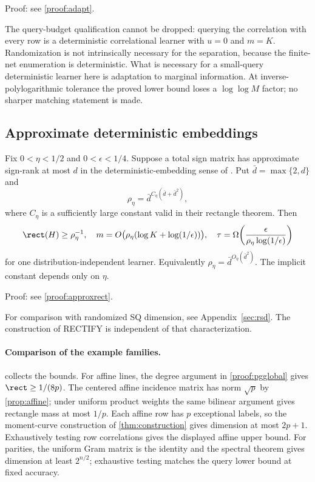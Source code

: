 \noindent Proof: see \cref{proof:adapt}.\par


The query-budget qualification cannot be dropped: querying the correlation with every row is a deterministic correlational learner with $u=0$ and $m=K$. Randomization is not intrinsically necessary for the separation, because the finite-net enumeration is deterministic. What is necessary for a small-query deterministic learner here is adaptation to marginal information. At inverse-polylogarithmic tolerance the proved lower bound loses a $\log\log M$ factor; no sharper matching statement is made.

\subsection{Approximate deterministic embeddings}
\begin{corollary}\label{cor:approxrect}
Fix $0<\eta<1/2$ and $0<\epsilon<1/4$. Suppose a total sign matrix has approximate sign-rank at most $d$ in the deterministic-embedding sense of \citet{BHKR26}. Put $\bar d=\max\{2,d\}$ and
\[
 \rho_\eta=\bar d^{C_\eta(\bar d+\bar d^2)},
\]
where $C_\eta$ is a sufficiently large constant valid in their rectangle theorem. Then
\[
 \rect(H)\ge\rho_\eta^{-1},\quad
 m=O\bigl(\rho_\eta(\log K+\log(1/\epsilon))\bigr),\quad
 \tau=\Omega\!\left(\frac{\epsilon}{\rho_\eta\log(1/\epsilon)}\right)
\]
for one distribution-independent learner. Equivalently $\rho_\eta=\bar d^{O_\eta(\bar d^2)}$. The implicit constant depends only on $\eta$.
\end{corollary}

\noindent Proof: see \cref{proof:approxrect}.\par
For comparison with randomized SQ dimension, see Appendix~\ref{sec:rsd}. The construction of RECTIFY is independent of that characterization.

\paragraph{Comparison of the example families.}
 collects the bounds. For affine lines, the degree argument in \cref{proof:pgglobal} gives $\rect\ge1/(8p)$. The centered affine incidence matrix has norm $\sqrt p$ by \cref{prop:affine}; under uniform product weights the same bilinear argument gives rectangle mass at most $1/p$. Each affine row has $p$ exceptional labels, so the moment-curve construction of \cref{thm:construction} gives dimension at most $2p+1$. Exhaustively testing row correlations gives the displayed affine upper bound. For parities, the uniform Gram matrix is the identity and the spectral theorem gives dimension at least $2^{n/2}$; exhaustive testing matches the query lower bound at fixed accuracy.

